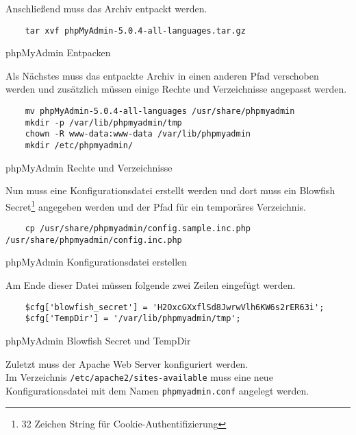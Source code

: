 Anschließend muss das Archiv entpackt werden.

\begin{listing}[H]
  \begin{verbatim}
    tar xvf phpMyAdmin-5.0.4-all-languages.tar.gz
  \end{verbatim}
  \caption{phpMyAdmin Entpacken}
\end{listing}

Als Nächstes muss das entpackte Archiv in einen anderen Pfad verschoben werden
und zusätzlich müssen einige Rechte und Verzeichnisse angepasst werden.

\begin{listing}[H]
  \begin{verbatim}
    mv phpMyAdmin-5.0.4-all-languages /usr/share/phpmyadmin
    mkdir -p /var/lib/phpmyadmin/tmp
    chown -R www-data:www-data /var/lib/phpmyadmin
    mkdir /etc/phpmyadmin/
  \end{verbatim}
  \caption{phpMyAdmin Rechte und Verzeichnisse}
\end{listing}

Nun muss eine Konfigurationsdatei erstellt werden und dort muss ein Blowfish
Secret\footnote{32 Zeichen String für Cookie-Authentifizierung} angegeben werden
und der Pfad für ein temporäres Verzeichnis.

\begin{listing}[H]
  \begin{verbatim}
    cp /usr/share/phpmyadmin/config.sample.inc.php /usr/share/phpmyadmin/config.inc.php
  \end{verbatim}
  \caption{phpMyAdmin Konfigurationsdatei erstellen}
\end{listing}

Am Ende dieser Datei müssen folgende zwei Zeilen eingefügt werden.

\begin{listing}[H]
  \begin{verbatim}
    $cfg['blowfish_secret'] = 'H2OxcGXxflSd8JwrwVlh6KW6s2rER63i'; 
    $cfg['TempDir'] = '/var/lib/phpmyadmin/tmp';
  \end{verbatim}
  \caption{phpMyAdmin Blowfish Secret und TempDir}
\end{listing}

Zuletzt muss der Apache Web Server konfiguriert werden.\\

Im Verzeichnis \verb|/etc/apache2/sites-available| muss eine neue
Konfigurationsdatei mit dem Namen \verb|phpmyadmin.conf| angelegt werden.


